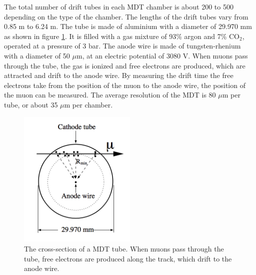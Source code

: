 The total number of drift tubes in each MDT chamber is about 200 to 500 depending on the type of the chamber.
The lengths of the drift tubes vary from 0.85 m to 6.24 m.
The tube is made of aluminium with a diameter of 29.970 mm as shown in figure \ref{fig:MDT}.
It is filled with a gas mixture of 93\% argon and 7\% CO$_2$, operated at a pressure of 3 bar.
The anode wire is made of tungsten-rhenium with a diameter of 50 $\mu$m, at an electric potential of 3080 V.
When muons pass through the tube, the gas is ionized and free electrons are produced, which are attracted and drift to the anode wire.
By measuring the drift time the free electrons take from the position of the muon to the anode wire, the position of the muon can be measured.
The average resolution of the MDT is 80 $\mu$m per tube, or about 35 $\mu$m per chamber.

\begin{figure}
\centering
\includegraphics[width=0.5\textwidth]{data/photo/detector/MDT.png}
\caption{The cross-section of a MDT tube. When muons pass through the tube, free electrons are produced along the track, which drift to the anode wire. \cite{ATLAS_doc}}
\label{fig:MDT}
\end{figure}
